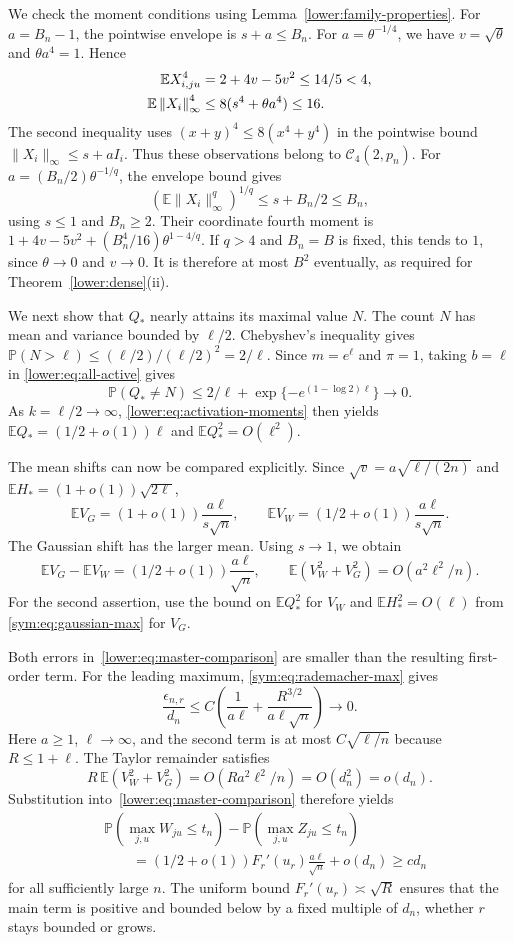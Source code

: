 \documentclass[11pt,letterpaper]{article}
\theoremstyle{remark}
\newcommand{\E}{\mathbb E}
\newcommand{\Pp}{\mathbb P}
\newcommand{\norm}[1]{\left\lVert#1\right\rVert}
\begin{document}
We check the moment conditions using Lemma~\ref{lower:family-properties}.
For $a=B_n-1$, the pointwise envelope is $s+a\le B_n$.
For $a=\theta^{-1/4}$, we have $v=\sqrt\theta$ and
$\theta a^4=1$. Hence
\begin{align}
 \E X_{i,ju}^4&=2+4v-5v^2\le14/5<4,\notag\\
 \E\norm{X_i}_\infty^4&\le8(s^4+\theta a^4)\le16.
 \label{sym:eq:q4-moments}
\end{align}
The second inequality uses $(x+y)^4\le8(x^4+y^4)$ in the
pointwise bound $\|X_i\|_\infty\le s+aI_i$.
Thus these observations belong to $\mathcal C_4(2,p_n)$.
For $a=(B_n/2)\theta^{-1/q}$, the envelope bound gives
\[
 (\E\|X_i\|_\infty^q)^{1/q}\le s+B_n/2\le B_n,
\]
using $s\le1$ and $B_n\ge2$. Their coordinate fourth moment is
$1+4v-5v^2+(B_n^4/16)\theta^{1-4/q}$.
If $q>4$ and $B_n=B$ is fixed, this tends to $1$, since
$\theta\to0$ and $v\to0$. It is therefore at most $B^2$
eventually, as required for Theorem~\ref{lower:dense}\textup{(ii)}.

We next show that $Q_*$ nearly attains its maximal value $N$.
The count $N$ has mean and variance bounded by $\ell/2$.
Chebyshev's inequality gives
$\Pp(N>\ell)\le(\ell/2)/(\ell/2)^2=2/\ell$.
Since $m=e^\ell$ and $\pi=1$, taking $b=\ell$ in
\eqref{lower:eq:all-active} gives
\[
 \Pp(Q_*\ne N)\le2/\ell+
       \exp\{-e^{(1-\log2)\ell}\}\longrightarrow0.
\]
As $k=\ell/2\to\infty$, \eqref{lower:eq:activation-moments}
then yields $\E Q_*=(1/2+o(1))\ell$ and
$\E Q_*^2=O(\ell^2)$.

The mean shifts can now be compared explicitly. Since
$\sqrt v=a\sqrt{\ell/(2n)}$ and
$\E H_*=(1+o(1))\sqrt{2\ell}$,
\[
 \E V_G=(1+o(1))\frac{a\ell}{s\sqrt n},\qquad
 \E V_W=(1/2+o(1))\frac{a\ell}{s\sqrt n}.
\]
The Gaussian shift has the larger mean. Using $s\to1$, we obtain
\[
 \E V_G-\E V_W=(1/2+o(1))\frac{a\ell}{\sqrt n},\qquad
 \E(V_W^2+V_G^2)=O(a^2\ell^2/n).
\]
For the second assertion, use the bound on $\E Q_*^2$ for
$V_W$ and $\E H_*^2=O(\ell)$ from
\eqref{sym:eq:gaussian-max} for $V_G$.

Both errors in~\eqref{lower:eq:master-comparison} are smaller
than the resulting first-order term. For the leading maximum,
\eqref{sym:eq:rademacher-max} gives
\[
 \frac{\epsilon_{n,r}}{d_n}
 \le C\left(\frac1{a\ell}
       +\frac{R^{3/2}}{a\ell\sqrt n}\right)\longrightarrow0.
\]
Here $a\ge1$, $\ell\to\infty$, and the second term is at
most $C\sqrt{\ell/n}$ because $R\le1+\ell$.
The Taylor remainder satisfies
\[
 R\,\E(V_W^2+V_G^2)
 =O(Ra^2\ell^2/n)=O(d_n^2)=o(d_n).
\]
Substitution into~\eqref{lower:eq:master-comparison} therefore yields
\begin{equation}
\begin{split}
 &\Pp(\max_{j,u}W_{ju}\le t_n)-\Pp(\max_{j,u}Z_{ju}\le t_n)\\
 &\qquad=(1/2+o(1))F_r'(u_r)\frac{a\ell}{\sqrt n}
          +o(d_n)\ge c d_n
\end{split}
 \label{sym:eq:common-discrepancy}
\end{equation}
for all sufficiently large $n$. The uniform bound
$F_r'(u_r)\asymp\sqrt R$ ensures that the main term is
positive and bounded below by a fixed multiple of $d_n$, whether
$r$ stays bounded or grows.
\end{document}
